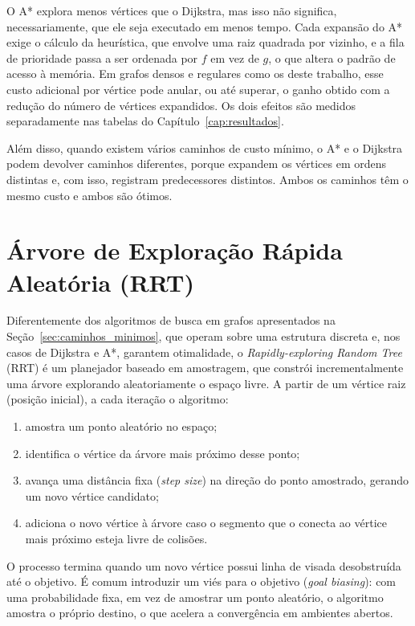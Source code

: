 \documentclass[
    12pt,
    openright,
    oneside,
    a4paper,
    english,
    brazil
]{abntex2}
\begin{document}
O A* explora menos vértices que o Dijkstra, mas isso não significa, necessariamente, que ele seja executado em menos tempo. Cada expansão do A* exige o cálculo da heurística, que envolve uma raiz quadrada por vizinho, e a fila de prioridade passa a ser ordenada por $f$ em vez de $g$, o que altera o padrão de acesso à memória. Em grafos densos e regulares como os deste trabalho, esse custo adicional por vértice pode anular, ou até superar, o ganho obtido com a redução do número de vértices expandidos. Os dois efeitos são medidos separadamente nas tabelas do Capítulo~\ref{cap:resultados}.

Além disso, quando existem vários caminhos de custo mínimo, o A* e o Dijkstra podem devolver caminhos diferentes, porque expandem os vértices em ordens distintas e, com isso, registram predecessores distintos. Ambos os caminhos têm o mesmo custo e ambos são ótimos.

\section{Árvore de Exploração Rápida Aleatória (RRT)}
\label{sec:rrt}

Diferentemente dos algoritmos de busca em grafos apresentados na Seção~\ref{sec:caminhos_minimos}, que operam sobre uma estrutura discreta e, nos casos de Dijkstra e A*, garantem otimalidade, o \textit{Rapidly-exploring Random Tree} (RRT) \cite{lavalle1998, xu2024} é um planejador baseado em amostragem, que constrói incrementalmente uma árvore explorando aleatoriamente o espaço livre. A partir de um vértice raiz (posição inicial), a cada iteração o algoritmo:

\begin{enumerate}
    \item amostra um ponto aleatório no espaço;
    \item identifica o vértice da árvore mais próximo desse ponto;
    \item avança uma distância fixa (\textit{step size}) na direção do ponto amostrado, gerando um novo vértice candidato;
    \item adiciona o novo vértice à árvore caso o segmento que o conecta ao vértice mais próximo esteja livre de colisões.
\end{enumerate}

O processo termina quando um novo vértice possui linha de visada desobstruída até o objetivo. É comum introduzir um viés para o objetivo (\textit{goal biasing}): com uma probabilidade fixa, em vez de amostrar um ponto aleatório, o algoritmo amostra o próprio destino, o que acelera a convergência em ambientes abertos.
\end{document}
